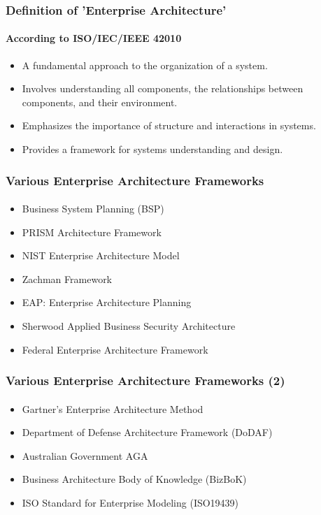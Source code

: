 \documentclass[aspectratio=169, table]{beamer}
\begin{document}
    \begin{frame}
        \frametitle{Definition of 'Enterprise Architecture'}
        \framesubtitle{According to ISO/IEC/IEEE 42010}
        \begin{itemize}
            \item A fundamental approach to the organization of a system.
            \item Involves understanding all components, the relationships between components, and their environment.
            \item Emphasizes the importance of structure and interactions in systems.
            \item Provides a framework for systems understanding and design.
        \end{itemize}
    \end{frame}



    \begin{frame}
        \frametitle{Various Enterprise Architecture Frameworks}
        \framesubtitle{\hspace{1cm}}
        \begin{itemize}
            \item Business System Planning (BSP)
            \item PRISM Architecture Framework
            \item NIST Enterprise Architecture Model
            \item Zachman Framework
            \item EAP: Enterprise Architecture Planning
            \item Sherwood Applied Business Security Architecture
            \item Federal Enterprise Architecture Framework

        \end{itemize}

    \end{frame}
    \begin{frame}
        \frametitle{Various Enterprise Architecture Frameworks (2)}
        \framesubtitle{\hspace{1cm}}
        \begin{itemize}
            \item Gartner's Enterprise Architecture Method
            \item Department of Defense Architecture Framework (DoDAF)
            \item Australian Government AGA
            \item Business Architecture Body of Knowledge (BizBoK)
            \item ISO Standard for Enterprise Modeling (ISO19439)
        \end{itemize}
    \end{frame}
\end{document}

